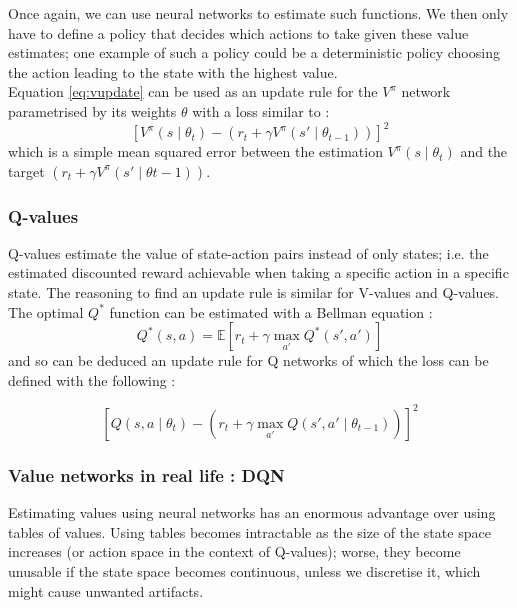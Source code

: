 Once again, we can
use neural networks to estimate such functions. We then only have to define
a policy that decides which actions to take given these value estimates; one
example of such a policy could be a deterministic policy choosing the action
leading to the state with the highest value.\\

Equation \ref{eq:vupdate} can be used as an update rule for the $V^\pi$ network 
parametrised by its weights $\theta$ with a loss similar to :
\begin{equation}
	\label{eq:v_update_rule}
	\left[V^\pi(s\mid \theta_t) -  \left(r_t + \gamma V^\pi(s'\mid \theta_{t-1}) \right)\right]^2 
\end{equation}
\noindent which is a simple mean squared error between the estimation $V^\pi(s\mid \theta_t)$ and
the target $\left(r_t + \gamma V^\pi(s'\mid \theta{t-1}) \right)$.

\subsubsection{Q-values} 
Q-values estimate the value of state-action pairs instead of
only states; i.e. the
estimated discounted reward achievable when taking a specific action in a 
specific state. The reasoning to find an update rule is similar for V-values
and Q-values. The optimal $Q^*$ function can be estimated with a Bellman equation :
$$ Q^*(s, a) = \mathbb{E}\left[ r_t + \gamma \max\limits_{a'} Q^*(s', a') \right]$$
\noindent and so can be deduced an update rule for Q networks of which the loss
can be defined with the following :

\begin{equation}
	\label{eq:q_update_rule}
\left[Q(s, a\mid \theta_t) - 
	\left( r_t + \gamma \max\limits_{a'} Q(s', a'\mid \theta_{t-1}) \right) \right]^2
\end{equation}

\subsubsection{Value networks in real life : DQN}
Estimating values using neural networks has an enormous advantage over using
tables of values. Using tables becomes intractable as the size of the state
space increases (or action space in the context of Q-values); worse, they become
unusable if the state space becomes continuous, unless we discretise it,
which might cause unwanted artifacts.\\

